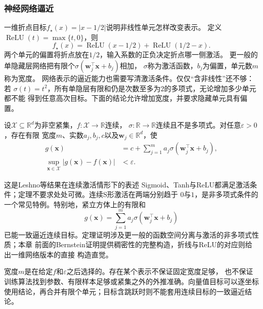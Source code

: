 \subsubsection{神经网络逼近}

一维折点目标$f_\star(x)=|x-1/2|$说明非线性单元怎样改变表示。
定义$\operatorname{ReLU}(t)=\max\{t,0\}$，则
\[
 f_\star(x)=\operatorname{ReLU}(x-1/2)+\operatorname{ReLU}(1/2-x).
\]
两个单元的偏置将折点放在$1/2$，输入系数的正负决定折点哪一侧激活。
更一般的单隐藏层网络把有限个$\sigma(\bm w_j^\top\bm x+b_j)$相加，
$\sigma$称为激活函数，$b_j$为偏置，单元数$m$称为宽度。
网络表示的逼近能力也需要写清激活条件。仅仅“含非线性”还不够：若
$\sigma(t)=t^2$，所有单隐层有限和仍是次数至多为$2$的多项式，无论增加多少单元都不能
得到任意高次目标。下面的结论允许增加宽度，并要求隐藏单元具有偏置。

\begin{theorem}[单隐藏层的通用逼近]
\label{thm:functional-universal-approximation}
设$\mathcal X\subseteq\mathbb R^d$为非空紧集，$f:\mathcal X\to\mathbb R$连续，
$\sigma:\mathbb R\to\mathbb R$连续且不是多项式。对任意$\varepsilon>0$，存在有限
宽度$m$、实数$a_j,b_j,c$以及$\bm w_j\in\mathbb R^d$，使
\begin{equation}
 \begin{aligned}
 g(\bm x)&=c+\sum_{j=1}^m a_j\sigma(\bm w_j^{\top}\bm x+b_j),\\
 \sup_{\bm x\in\mathcal X}|g(\bm x)-f(\bm x)|&<\varepsilon.
 \end{aligned}
 \label{eq:functional-universal-approximation}
\end{equation}
\end{theorem}

这是Leshno等结果在连续激活情形下的表述
Sigmoid、Tanh与ReLU都满足激活条件；定理不要求处处可微。连续S形激活在两端分别趋于
$0$与$1$，是非多项式条件的一个常见特例。特别地，紧立方体上的有限和
\begin{equation}
 g(\bm x)=\sum_{j=1}^m a_j\sigma(\bm w_j^{\top}\bm x+b_j)
 \label{eq:functional-sigmoidal-network}
\end{equation}
已能一致逼近连续目标。定理证明涉及更一般的函数空间分离与激活的非多项式性质；本章
前面的Bernstein证明提供稠密性的完整构造，折线与ReLU的对应则给出一维网络版本的直接
构造直觉。

宽度$m$是在给定$f$和$\varepsilon$之后选择的。存在某个表示不保证固定宽度足够，
也不保证训练算法找到参数、有限样本足够或紧集之外的外推准确。向量值目标可以逐坐标
使用结论，再合并有限个单元；目标含跳跃时则不能套用连续目标的一致逼近结论。

